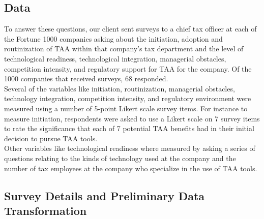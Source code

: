 \documentclass[12pt]{article}
\begin{document}


\subsection{Data}

To answer these questions, our client sent surveys to a chief tax officer at each of the Fortune 1000 companies asking about the initiation, adoption and routinization of TAA within that company's tax department and the level of technological readiness, technological integration, managerial obstacles, competition intensity, and regulatory support for TAA for the company. Of the 1000 companies that received surveys, 68 responded.\\

Several of the variables like initiation, routinization, managerial obstacles, technology integration, competition intensity, and regulatory environment were measured using a number of 5-point Likert scale survey items. For instance to measure initiation, respondents were asked to use a Likert scale on 7 survey items to rate the significance that each of 7 potential TAA benefits had in their initial decision to pursue TAA tools. \\

Other variables like technological readiness where measured by asking a series of questions relating to the kinds of technology used at the company and the number of tax employees at the company who specialize in the use of TAA tools. \\




\subsection{Survey Details and Preliminary Data Transformation}
\end{document}
